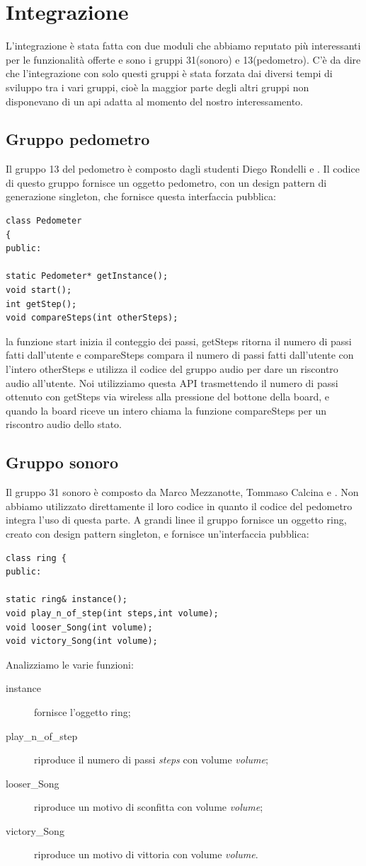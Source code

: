 \chapter{Integrazione}
L'integrazione è stata fatta con due moduli che abbiamo reputato più interessanti per le funzionalità offerte e sono i gruppi 31(sonoro) e 13(pedometro). C'è da dire che l'integrazione con solo questi gruppi è stata forzata dai diversi tempi di sviluppo tra i vari gruppi, cioè la maggior parte degli altri gruppi non disponevano di un api adatta al momento del nostro interessamento.

\section{Gruppo pedometro}
Il gruppo 13 del pedometro è composto dagli studenti Diego Rondelli e . Il codice di questo gruppo fornisce un oggetto pedometro, con un design pattern di generazione singleton, che fornisce questa interfaccia pubblica:
\begin{verbatim}
class Pedometer
{
public:

static Pedometer* getInstance();
void start();
int getStep();
void compareSteps(int otherSteps);
\end{verbatim}
la funzione start inizia il conteggio dei passi, getSteps ritorna il numero di passi fatti dall'utente e compareSteps compara il numero di passi fatti dall'utente con l'intero otherSteps e utilizza il codice del gruppo audio per dare un riscontro audio all'utente.
Noi utilizziamo questa API trasmettendo il numero di passi ottenuto con getSteps via wireless alla pressione del bottone della board, e quando la board riceve un intero chiama la funzione compareSteps per un riscontro audio dello stato.

\section{Gruppo sonoro}
Il gruppo 31 sonoro è composto da Marco Mezzanotte, Tommaso Calcina e . Non abbiamo utilizzato direttamente il loro codice in quanto il codice del pedometro integra l'uso di questa parte. A grandi linee il gruppo fornisce un oggetto ring, creato con design pattern singleton, e fornisce un'interfaccia pubblica:
\begin{verbatim}
class ring {
public:

static ring& instance();
void play_n_of_step(int steps,int volume);
void looser_Song(int volume);
void victory_Song(int volume);
\end{verbatim}
Analizziamo le varie funzioni:
\begin{description}
	\item [instance] fornisce l'oggetto ring;
	\item [play\_n\_of\_step] riproduce il numero di passi \emph{steps} con volume \emph{volume};
	\item [looser\_Song] riproduce un motivo di sconfitta con volume \emph{volume};
	\item [victory\_Song] riproduce un motivo di vittoria con volume \emph{volume}.
\end{description}

